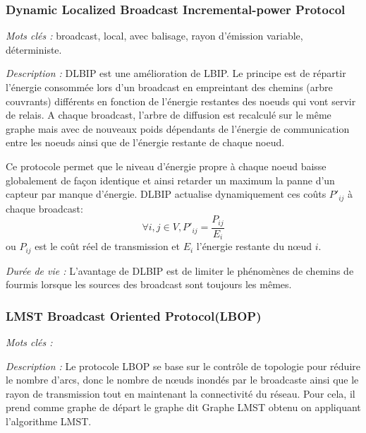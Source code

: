 



\subsubsection{Dynamic Localized Broadcast Incremental-power Protocol \cite{Champ2009DLBIP}}
\emph{Mots clés :} broadcast, local, avec balisage, rayon d'émission variable, déterministe.

\emph{Description :} DLBIP est une amélioration de LBIP. Le principe est de répartir l'énergie consommée lors d'un broadcast en empreintant des chemins (arbre couvrants) différents en fonction de l'énergie restantes des noeuds qui vont servir de relais. A chaque broadcast, l'arbre de diffusion est recalculé sur le même graphe mais avec de nouveaux poids dépendants de l'énergie de communication entre les noeuds ainsi que de l'énergie restante de chaque noeud.

Ce protocole permet que le niveau d'énergie propre à chaque noeud baisse globalement de façon identique et ainsi retarder un maximum la panne d'un capteur par manque d'énergie.
DLBIP actualise dynamiquement ces coûts $P'_{ij}$ à chaque broadcast:
$$ \forall i,j \in V, P'_{ij}=\frac{P_{ij}}{E_i}$$
ou $P_{ij}$ est le coût réel de transmission et $E_i$ l'énergie restante du nœud $i$.




\emph{Durée de vie :} L'avantage de DLBIP est de limiter le phénomènes de chemins de fourmis lorsque les sources des broadcast sont toujours les mêmes.




\subsubsection{LMST Broadcast Oriented Protocol(LBOP)\cite{Cartigny2005}}
\emph{Mots clés :} 

\emph{Description :} Le protocole LBOP se base sur le contrôle de topologie pour réduire le nombre d'arcs, donc le nombre de nœuds inondés par le broadcaste ainsi que le rayon de transmission tout en maintenant la connectivité du réseau. Pour cela, il prend comme graphe de départ le graphe dit Graphe LMST obtenu on appliquant l’algorithme LMST.
